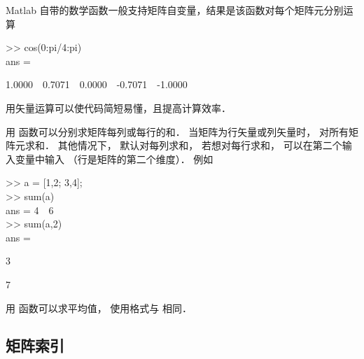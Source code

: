 Matlab 自带的数学函数一般支持矩阵自变量，结果是该函数对每个矩阵元分别运算
\begin{Command}
>> cos(0:pi/4:pi)\\
ans = \par
1.0000\ \ 0.7071\ \ 0.0000\ \ -0.7071\ \ -1.0000
\end{Command}
用矢量运算可以使代码简短易懂，且提高计算效率．

用  函数可以分别求矩阵每列或每行的和． 当矩阵为行矢量或列矢量时，  对所有矩阵元求和． 其他情况下，  默认对每列求和， 若想对每行求和， 可以在第二个输入变量中输入  （行是矩阵的第二个维度）． 例如
\begin{Command}
>> a = [1,2; 3,4];\\
>> sum(a)\\
ans = 4\ \ 6\\
>> sum(a,2)\\
ans =\par 3\par 7
\end{Command}
用  函数可以求平均值， 使用格式与  相同．

\subsection{矩阵索引}

